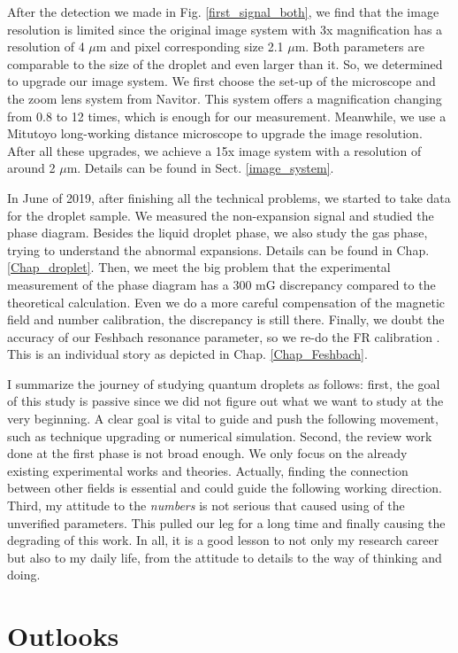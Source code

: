 After the detection we made in Fig. \ref{first_signal_both}, we find that the image resolution is limited since the original image system with 3x magnification has a resolution of 4 $\mu$m and pixel corresponding size 2.1 $\mu$m. Both parameters are comparable to the size of the droplet and even larger than it. So, we determined to upgrade our image system. We first choose the set-up of the microscope and the zoom lens system from Navitor. This system offers a magnification changing from 0.8 to 12 times, which is enough for our measurement. Meanwhile, we use a Mitutoyo long-working distance microscope to upgrade the image resolution. After all these upgrades, we achieve a 15x image system with a resolution of around 2 $\mu$m. Details can be found in Sect. \ref{image_system}.

In June of 2019, after finishing all the technical problems, we started to take data for the droplet sample. We measured the non-expansion signal and studied the phase diagram. Besides the liquid droplet phase, we also study the gas phase, trying to understand the abnormal expansions. Details can be found in Chap. \ref{Chap_droplet}. Then, we meet the big problem that the experimental measurement of the phase diagram has a 300 mG discrepancy compared to the theoretical calculation. Even we do a more careful compensation of the magnetic field and number calibration, the discrepancy is still there. Finally, we doubt the accuracy of our Feshbach resonance parameter, so we re-do the FR calibration \cite{guo2021tunable}. This is an individual story as depicted in Chap. \ref{Chap_Feshbach}.

I summarize the journey of studying quantum droplets as follows: first, the goal of this study is passive since we did not figure out what we want to study at the very beginning. A clear goal is vital to guide and push the following movement, such as technique upgrading or numerical simulation. Second, the review work done at the first phase is not broad enough. We only focus on the already existing experimental works and theories. Actually, finding the connection between other fields is essential and could guide the following working direction. Third, my attitude to the \textit{numbers} is not serious that caused using of the unverified parameters. This pulled our leg for a long time and finally causing the degrading of this work. In all, it is a good lesson to not only my research career but also to my daily life, from the attitude to details to the way of thinking and doing.


\section{Outlooks}

\chapterend

